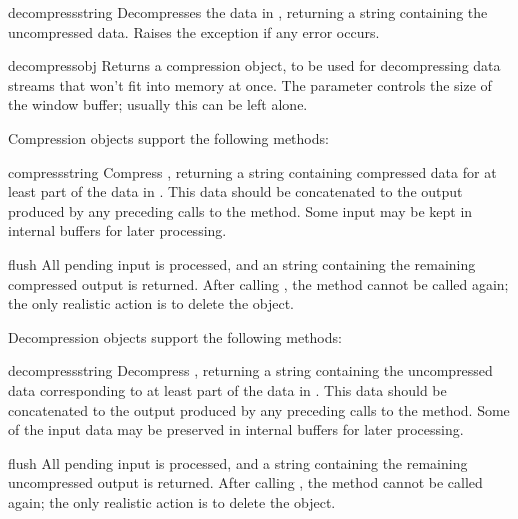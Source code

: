 \begin{funcdesc}{decompress}{string}
Decompresses the data in , returning a string containing
the uncompressed data.  Raises the  exception if any
error occurs.
\end{funcdesc}

\begin{funcdesc}{decompressobj}{}
Returns a compression object, to be used for decompressing data streams
that won't fit into memory at once.  The  parameter
controls the size of the window buffer; usually this can be left
alone.
\end{funcdesc}

Compression objects support the following methods:

\begin{funcdesc}{compress}{string}
Compress , returning a string containing compressed data
for at least part of the data in .  This data should be
concatenated to the output produced by any preceding calls to the
 method.  Some input may be kept in internal buffers
for later processing.
\end{funcdesc}

\begin{funcdesc}{flush}{}
All pending input is processed, and an string containing the remaining
compressed output is returned.  After calling , the
 method cannot be called again; the only realistic
action is to delete the object.
\end{funcdesc}

Decompression objects support the following methods:

\begin{funcdesc}{decompress}{string}
Decompress , returning a string containing the
uncompressed data corresponding to at least part of the data in
.  This data should be concatenated to the output produced
by any preceding calls to the
 method.  Some of the input data may be preserved
in internal buffers for later processing.
\end{funcdesc}

\begin{funcdesc}{flush}{}
All pending input is processed, and a string containing the remaining
uncompressed output is returned.  After calling , the
 method cannot be called again; the only realistic
action is to delete the object.
\end{funcdesc}



